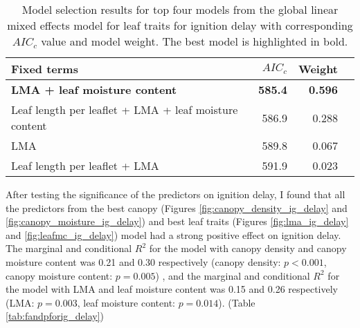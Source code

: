 \documentclass{ttuthes2007}
\begin{document}
\begin{table}
  \centering
  \caption{Model selection results for top four models from the global linear
    mixed effects model for leaf traits for ignition delay with corresponding
    $AIC_{c}$ value and model weight. The best model is highlighted in bold.}
  \begin{tabular}{lrrr}
    \toprule
    \textbf{Fixed terms} & $AIC_{c}$ & \textbf{Weight}\\
    \midrule
    \textbf{LMA + leaf moisture content}    & \textbf{585.4} & \textbf{0.596} \\
    Leaf length per leaflet + LMA + leaf moisture content & 586.9          & 0.288          \\
    LMA                                                   & 589.8          & 0.067          \\
    Leaf length per leaflet + LMA                         & 591.9          & 0.023          \\
    \bottomrule
  \end{tabular}
  \label{tab:leaf_models_ignition_delay}
\end{table}





After testing the significance of the predictors on ignition delay, I found that all the predictors from the best canopy (Figures \ref{fig:canopy_density_ig_delay} and \ref{fig:canopy_moisture_ig_delay}) and best leaf traits (Figures \ref{fig:lma_ig_delay} and \ref{fig:leafmc_ig_delay}) model had a strong positive effect on ignition delay. The marginal and conditional $R^2$ for the model with canopy density and canopy moisture content was 0.21 and 0.30 respectively (canopy density: $p < 0.001$, canopy moisture content: $p = 0.005$) , and the marginal and conditional $R^2$ for the model with LMA and leaf moisture content was 0.15 and 0.26 respectively (LMA: $p = 0.003$, leaf moisture content: $p = 0.014$). (Table \ref{tab:fandpforig_delay})
\end{document}
